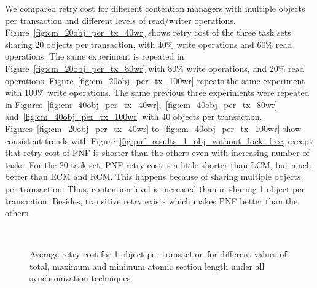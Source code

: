 \documentclass[12pt,english]{report}
\begin{document}
We compared retry cost for different contention managers with multiple objects per transaction and different levels of read/writer operations. Figure~\ref{fig:cm_20obj_per_tx_40wr} shows retry cost of the three task sets sharing 20 objects per transaction, with 40\% write operations and 60\% read operations. The same experiment is repeated in Figure~\ref{fig:cm_20obj_per_tx_80wr} with 80\% write operations, and 20\% read operations. Figure~\ref{fig:cm_20obj_per_tx_100wr} repeats the same experiment with 100\% write operations. The same previous three experiments were repeated in Figures~\ref{fig:cm_40obj_per_tx_40wr},~\ref{fig:cm_40obj_per_tx_80wr} and~\ref{fig:cm_40obj_per_tx_100wr} with 40 objects per transaction. Figures~\ref{fig:cm_20obj_per_tx_40wr} to~\ref{fig:cm_40obj_per_tx_100wr} show consistent trends with Figure~\ref{fig:pnf_results_1_obj_without_lock_free} except that retry cost of PNF is shorter than the others even with increasing number of tasks. For the 20 task set, PNF retry cost is a little shorter than LCM, but much better than ECM and RCM. This happens because of sharing multiple objects per transaction. Thus, contention level is increased than in sharing 1 object per transaction. Besides, transitive retry exists which makes PNF better than the others.

\begin{figure}
\centering

~
~
\caption{Average retry cost for 1 object per transaction for different values of total, maximum and minimum atomic section length under all synchronization techniques}
\label{fig:pnf_results_1_obj_all}
\end{figure}
\end{document}
